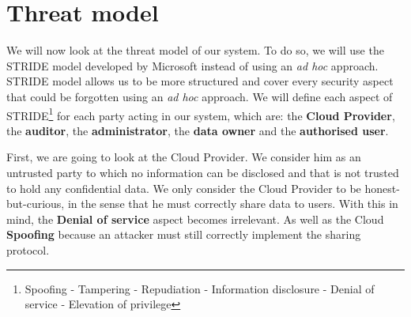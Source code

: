 \documentclass[../main.tex]{subfiles}
\begin{document}
\section{Threat model}
\label{section:problem:threat_model}

\par We will now look at the threat model of our system. To do so, we will use the STRIDE model developed by Microsoft\cite{wiki:stride} instead of using an \textit{ad hoc} approach. STRIDE model allows us to be more structured and cover every security aspect that could be forgotten using an \textit{ad hoc} approach. We will define each aspect of STRIDE\footnote{Spoofing - Tampering - Repudiation - Information disclosure - Denial of service - Elevation of privilege} for each party acting in our system, which are: the \textbf{Cloud Provider}, the \textbf{auditor}, the \textbf{administrator}, the \textbf{data owner} and the \textbf{authorised user}.

\medbreak
\par First, we are going to look at the Cloud Provider. We consider him as an untrusted party to which no information can be disclosed and that is not trusted to hold any confidential data. We only consider the Cloud Provider to be honest-but-curious, in the sense that he must correctly share data to users. With this in mind, the \textbf{Denial of service} aspect becomes irrelevant. As well as the Cloud \textbf{Spoofing} because an attacker must still correctly implement the sharing protocol.\\
\end{document}
